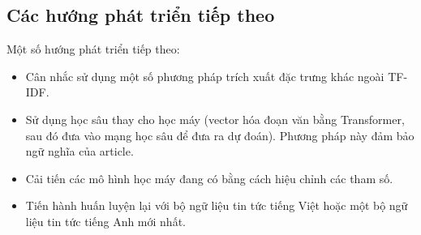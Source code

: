 \documentclass[12pt]{article}
\begin{document}
\subsection{Các hướng phát triển tiếp theo}
Một số hướng phát triển tiếp theo:
\begin{itemize}
\item Cân nhắc sử dụng một số phương pháp trích xuất đặc trưng khác ngoài TF-IDF.
\item Sử dụng học sâu thay cho học máy (vector hóa đoạn văn bằng Transformer, sau đó đưa vào mạng học sâu để đưa ra dự đoán). Phương pháp này đảm bảo ngữ nghĩa của article.
\item Cải tiến các mô hình học máy đang có bằng cách hiệu chỉnh các tham số.
\item Tiến hành huấn luyện lại với bộ ngữ liệu tin tức tiếng Việt hoặc một bộ ngữ liệu tin tức tiếng Anh mới nhất.
\end{itemize}

\cleardoublepage
{}
{}


\end{document}
